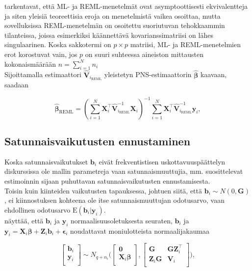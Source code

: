 \documentclass[finnish]{docopts}
\begin{document}
\cite{diggle13} tarkentavat, että ML- ja REML-menetelmät ovat asymptoottisesti ekvivalentteja ja siten yleisiä teoreettisia eroja on menetelmistä vaikea osoittaa, mutta sovelluksissa REML-menetelmän on osoitettu suoriutuvan tehokkaammin tilanteissa, joissa esimerkiksi käännettävä kovarianssimatriisi on lähes singulaarinen. Koska sakkotermi on $p \times p$ matriisi, ML- ja REML-menetelmien erot korostuvat vain, jos $p$ on suuri suhteessa aineiston mittausten kokonaismäärään $n = \sum\limits_{i=1}^{N} n_i$ \\                                                                  

Sijoittamalla estimaattori $\hat{\bm{V}}_{i_{\text{REML}}}$ yleistetyn PNS-estimaattorin $\hat{\bm{\beta}}$ kaavaan, saadaan

$$
\hat{\bm{\beta}}_{\text{REML}} =  (\sum\limits_{i=1}^{N} \bm{X}_{i}^\top \hat{\bm{V}}_{i_{\text{REML}}}^{-1} \bm{X}_{i})^{-1} \sum\limits_{i=1}^{N} \bm{X}_{i}^\top \hat{\bm{V}}_{i_{\text{REML}}}^{-1} \bm{y}_i,
$$

\subsection{Satunnaisvaikutusten ennustaminen}
\label{sub:satunnaisvaik}

Koska satunnaisvaikutukset $\bm{b}_i$ eivät frekventistisen uskottavuuspäättelyn diskurssissa ole mallin parametreja vaan satunnaismuuttujia, mm. \cite{west14, pinheiro00} suosittelevat estimoinnin sijaan puhuttavan satunnaisvaikutusten ennustamisesta. \\

Toisin kuin kiinteiden vaikutusten tapauksessa, johtuen siitä, että $\bm{b}_i \sim N(0, \bm{G})$, ei kiinnostuksen kohteena ole itse satunnaismuuttujan odotusarvo, vaan ehdollinen odotusarvo $\text{E}(\bm{b}_i | \bm{y}_i)$. \\

\cite{nissinen09} näyttää, että $\bm{b}_i$ ja $\bm{y}_i$ normaalisuusoletuksesta seuraten, $\bm{b}_i$ ja $\bm{y}_i = \bm{X}_i \bm{\beta} + \bm{Z}_i \bm{b}_i + \bm{\epsilon}_i$ noudattavat moniulotteista normaalijakaumaa

$$
\begin{bmatrix}
\bm{b}_i \\
\bm{y}_i \\
\end{bmatrix}
\sim N_{q+n_i} \bigg(
\begin{bmatrix}
\bm{0} \\
\bm{X}_i \bm{\beta} \\
\end{bmatrix},
\begin{bmatrix}
\bm{G} & \bm{G} \bm{Z}_{i}^\top \\
\bm{Z}_i \bm{G} & \bm{V}_i \\
\end{bmatrix}
\bigg),
$$
\end{document}
